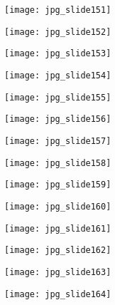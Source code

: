 \documentclass[main.tex]{subfiles}
\begin{document}
\begin{center}
\texttt{[image: jpg\_slide151]}
\end{center}

\begin{center}
\texttt{[image: jpg\_slide152]}
\end{center}

\begin{center}
\texttt{[image: jpg\_slide153]}
\end{center}

\begin{center}
\texttt{[image: jpg\_slide154]}
\end{center}

\begin{center}
\texttt{[image: jpg\_slide155]}
\end{center}

\begin{center}
\texttt{[image: jpg\_slide156]}
\end{center}

\begin{center}
\texttt{[image: jpg\_slide157]}
\end{center}

\begin{center}
\texttt{[image: jpg\_slide158]}
\end{center}

\begin{center}
\texttt{[image: jpg\_slide159]}
\end{center}

\begin{center}
\texttt{[image: jpg\_slide160]}
\end{center}

\begin{center}
\texttt{[image: jpg\_slide161]}
\end{center}

\begin{center}
\texttt{[image: jpg\_slide162]}
\end{center}

\begin{center}
\texttt{[image: jpg\_slide163]}
\end{center}

\begin{center}
\texttt{[image: jpg\_slide164]}
\end{center}
\end{document}
